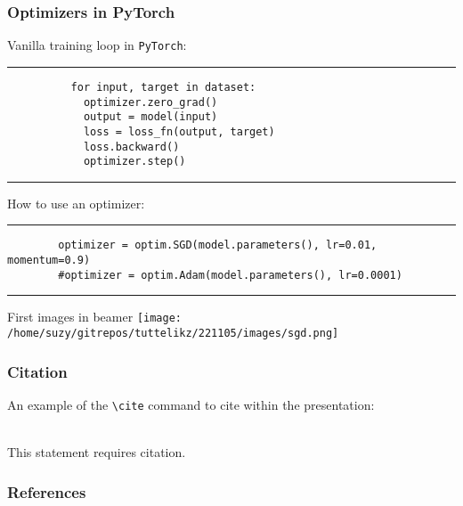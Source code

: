 \documentclass{beamer}
\begin{document}
    \begin{frame}[fragile]
      \frametitle{Optimizers in PyTorch}

      Vanilla training loop in \verb|PyTorch|:
      \rule{\textwidth}{1pt}
      \scriptsize
      \begin{verbatim}
          for input, target in dataset:
            optimizer.zero_grad()
            output = model(input)
            loss = loss_fn(output, target)
            loss.backward()
            optimizer.step()
      \end{verbatim}
      \rule{\textwidth}{1pt}
      
      \normalsize
      \vspace{1cm}
      How to use an optimizer:
      \rule{\textwidth}{1pt}
      \scriptsize
      \begin{verbatim}
        optimizer = optim.SGD(model.parameters(), lr=0.01, momentum=0.9)
        #optimizer = optim.Adam(model.parameters(), lr=0.0001)
      \end{verbatim}
      \rule{\textwidth}{1pt}
      

    \end{frame}

    \begin{frame}{First images in beamer}
      \centering
          \texttt{[image: /home/suzy/gitrepos/tuttelikz/221105/images/sgd.png]}
    \end{frame}
    

    \begin{frame}[fragile] %
    \frametitle{Citation}
    An example of the \verb|\cite| command to cite within the presentation:\\~
    
    This statement requires citation.~\cite{test1} 
    \end{frame}

    

    \begin{frame}[t, allowframebreaks]
      \frametitle{References}
      
      
    \end{frame}
\end{document}
